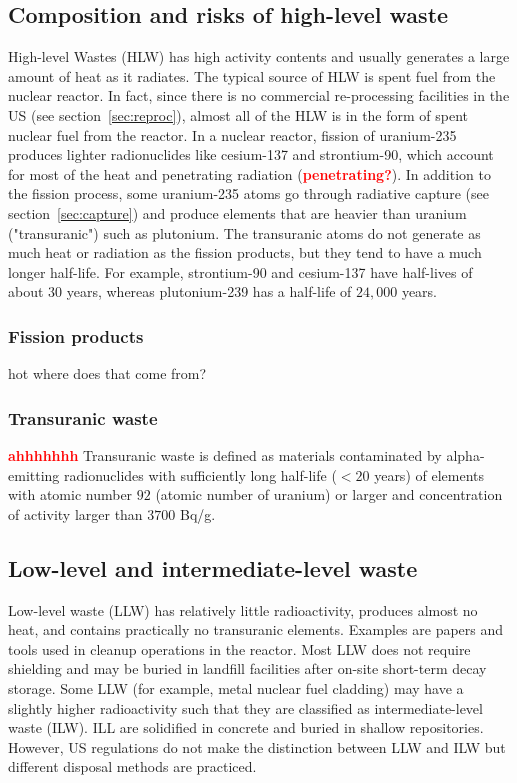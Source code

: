 \documentclass[preprint,aip,pra]{revtex4-1}
\newcommand{\red}[1]{\textcolor{red}{\bf #1}}
\begin{document}
    \subsection{Composition and risks of high-level waste}
    High-level Wastes (HLW) has high activity contents and usually generates a large amount of
    heat as it radiates. The typical source of HLW is spent fuel from the nuclear reactor.
    In fact, since there is no commercial re-processing facilities in the US (see section~\ref{sec:reproc}),
    almost all of the HLW is in the form of spent nuclear fuel from the reactor. In a nuclear reactor,
    fission of uranium-235 produces lighter radionuclides like cesium-137 and strontium-90, which
    account for most of the heat and penetrating radiation (\red{penetrating?}). In addition to
    the fission process, some uranium-235 atoms go through radiative capture
    (see section~\ref{sec:capture}) and produce elements that are
    heavier than uranium ("transuranic") such as plutonium. The transuranic atoms do not generate
    as much heat or radiation as the fission products, but they tend to have a much longer half-life.
    For example, strontium-90 and cesium-137 have half-lives of about $30$ years, whereas
    plutonium-239 has a half-life of $24,000$ years.
    \subsubsection{Fission products}
    hot where does that come from?
    \subsubsection{Transuranic waste}
    \red{ahhhhhhh}
    Transuranic waste is defined as materials contaminated by alpha-emitting radionuclides with
    sufficiently long half-life ($<20$ years) of elements with atomic number $92$ (atomic number of uranium)
    or larger and concentration of activity larger than $3700$ Bq/g.\cite{j83}

    \subsection{Low-level and intermediate-level waste}
    Low-level waste (LLW) has relatively little radioactivity, produces almost no heat,
    and contains practically no
    transuranic elements. Examples are papers and tools used in cleanup operations in the reactor.
    Most LLW does not require shielding and may be buried in landfill 
    facilities after on-site short-term decay storage.
    Some LLW (for example, metal nuclear fuel cladding) may have a slightly
    higher radioactivity such that they are classified
    as intermediate-level waste (ILW). ILL are solidified in concrete and buried in shallow
    repositories.\cite{s01} However, US regulations do not make the distinction
    between LLW and ILW but different disposal methods are practiced.\cite{nrc09, s01}
\end{document}
